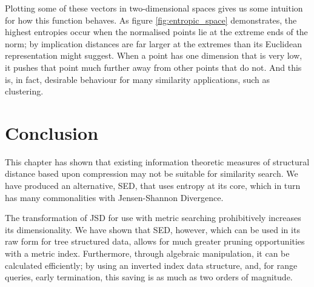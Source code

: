 Plotting some of these vectors in two-dimensional spaces gives us some intuition for how this function behaves.  As figure \ref{fig:entropic_space} demonstrates, the highest entropies occur when the normalised points lie at the extreme ends of the norm; by implication distances are far larger at the extremes than its Euclidean representation might suggest.  When a point has one dimension that is very low, it pushes that point much further away from other points that do not.  And this is, in fact, desirable behaviour for many similarity applications, such as clustering.  

\section{Conclusion}
This chapter has shown that existing information theoretic measures of structural distance based upon compression may not be suitable for similarity search.  We have produced an alternative, SED, that uses entropy at its core, which in turn has many commonalities with Jensen-Shannon Divergence.  

The transformation of JSD for use with metric searching prohibitively increases its dimensionality.  We have shown that SED, however, which can be used in its raw form for tree structured data, allows for much greater pruning opportunities with a metric index.  Furthermore, through algebraic manipulation, it can be calculated efficiently; by using an inverted index data structure, and, for range queries, early termination, this saving is as much as two orders of magnitude.
